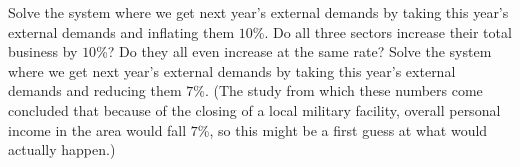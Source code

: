 \begin{exercises}
\begin{exparts}
        \partsitem Solve the system where we get next year's external demands
          by taking this year's external demands and
          inflating them $10$\%.
          Do all three sectors increase their total business by
          $10$\%?
          Do they all even increase at the same rate? 
        \partsitem Solve the system where we get next year's external demands
          by taking this year's external demands and
          reducing them $7$\%.
          (The study from which these numbers come concluded that
          because of the closing of a local military facility, overall
          personal income in the area would fall $7$\%, so this might 
          be a first guess at what would actually happen.)
      \end{exparts}
\end{exercises}
\endinput
